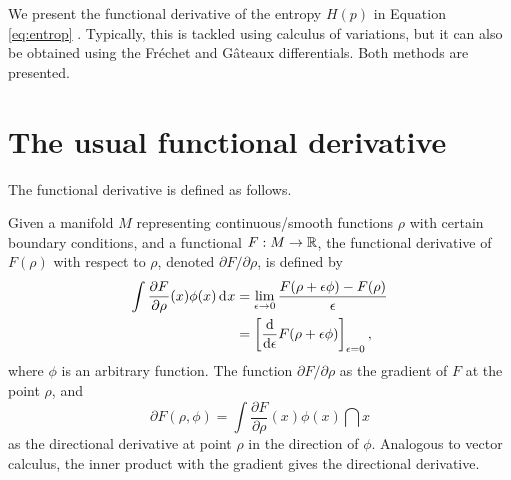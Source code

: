 We present the functional derivative of the entropy $H(p)$ in {\color{\mycitecolour}Equation} \ref{eq:entrop} .
Typically, this is tackled using calculus of variations, but it can also be obtained using the Fréchet and Gâteaux differentials.
Both methods are presented.

\section{The usual functional derivative}


The functional derivative is defined as follows.

\begin{definition}
  Given a manifold $M$ representing continuous/smooth functions $\rho$ with certain boundary conditions, and a functional $F:M\to\mathbb{R}$, the functional derivative of $F(\rho)$ with respect to $\rho$, denoted $\partial F/\partial\rho$, is defined by
  \begin{align*}
    \int \frac{\partial F}{\partial\rho}(x)\phi(x) \operatorname{d}\hspace{0.5pt}\! x
    &= \lim_{\epsilon\to 0} \frac{F(\rho + \epsilon\phi) - F(\rho)}{\epsilon} \\
    &= \left[ \frac{\text{d}}{\text{d} \epsilon} F(\rho + \epsilon\phi) \right]_{\epsilon=0},
  \end{align*}
  where $\phi$ is an arbitrary function.
  The function $\partial F/\partial\rho$ as the gradient of $F$ at the point $\rho$, and
  \[
    \partial F(\rho,\phi) = \int \frac{\partial F}{\partial\rho}(x)\phi(x) \dint x
  \]
  as the directional derivative at point $\rho$ in the direction of $\phi$.
  Analogous to vector calculus, the inner product with the gradient gives the directional derivative.
\end{definition}

